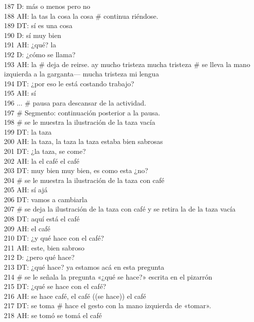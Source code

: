 187 D: más o menos pero no\\
188 AH: la tas la cosa la cosa \# continua riéndose.\\
189 DT: sí es una cosa\\
190 D: sí muy bien\\
191 AH: ¿qué? la\\
192 D: ¿cómo se llama?\\
193 AH: la \# deja de reirse. ay mucho tristeza mucha tristeza \# se lleva la mano izquierda a la garganta--- mucha tristeza mi lengua\\
194 DT: ¿por eso le está costando trabajo?\\
195 AH: sí\\
196 ... \# pausa para descansar de la actividad.\\
197 \# Segmento: continuación posterior a la pausa.\\
198 \# se le muestra la ilustración de la taza vacía\\
199 DT: la taza\\
200 AH: la taza, la taza la taza estaba bien sabrosas\\
201 DT: ¿la taza, se come?\\
202 AH: la el café el café\\
203 DT: muy bien muy bien, es como esta ¿no?\\
204 \# se le muestra la ilustración de la taza con café\\
205 AH: sí ajá\\
206 DT: vamos a cambiarla\\
207 \# se deja la ilustración de la taza con café y se retira la de la taza vacía\\
208 DT: aquí está el café\\
209 AH: el café\\
210 DT: ¿y qué hace con el café?\\
211 AH: este, bien sabroso\\
212 D: ¿pero qué hace?\\
213 DT: ¿qué hace? ya estamos acá en esta pregunta\\
214 \# se le señala la pregunta «¿qué se hace?» escrita en el pizarrón\\
215 DT: ¿qué se hace con el café?\\
216 AH: se hace café, el café ((se hace)) el café\\
217 DT: se toma \# hace el gesto con la mano izquierda de «tomar».\\
218 AH: se tomó se tomá el café\\
